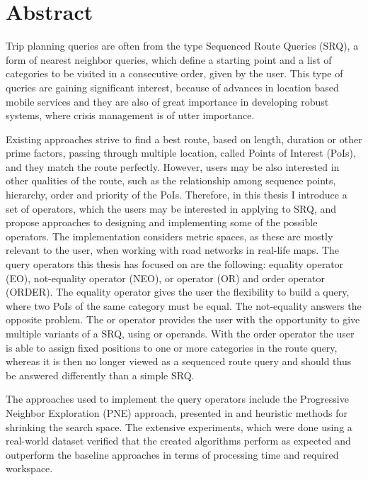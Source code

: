 \chapter{Abstract}
Trip planning queries are often from the type Sequenced Route Queries (SRQ), a form of nearest neighbor queries, which define a starting point and a list of categories to be visited in a consecutive order, given by the user. This type of queries are gaining significant interest, because of advances in location based mobile services and they are also of great importance in developing robust systems, where crisis management is of utter importance. 

Existing approaches strive to find a best route, based on length, duration or other prime factors, passing through multiple location, called Points of Interest (PoIs), and they match the route perfectly. However, users may be also interested in other qualities of the route, such as the relationship among sequence points, hierarchy, order and priority of the PoIs. Therefore, in this thesis  I introduce a set of operators, which the users may be interested in applying to SRQ, and propose approaches to designing and implementing some of the possible operators. The implementation considers metric spaces, as these are mostly relevant to the user, when working with road networks in real-life maps.
The query operators this thesis has focused on are the following: equality operator (EO), not-equality operator (NEO), or operator (OR) and order operator (ORDER). The equality operator gives the user the flexibility to build a query, where two PoIs of the same category must be equal. The not-equality answers the opposite problem. The or operator provides the user with the opportunity to give multiple variants of a SRQ, using or operands. With the order operator the user is able to assign fixed positions to one or more categories in the route query, whereas it is then no longer viewed as a sequenced route query and should thus be answered differently than a simple SRQ.

The approaches used to implement the query operators include the Progressive Neighbor Exploration (PNE) approach, presented in \cite{OSR} and heuristic methods for shrinking the search space. The extensive experiments, which were done using a real-world dataset verified that the created algorithms perform as expected and outperform the baseline approaches in terms of processing time and required workspace.

\enlargethispage{\baselineskip}

\pagebreak
